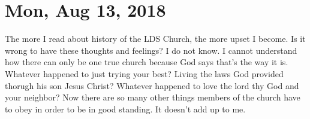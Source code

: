 \section{Mon, Aug 13, 2018}

The more I read about history of the LDS Church, the more upset I become. Is it wrong
to have these thoughts and feelings? I do not know. I cannot understand how there can
only be one true church because God says that's the way it is. Whatever happened to
just trying your best? Living the laws God provided thorugh his son Jesus Christ?
Whatever happened to love the lord thy God and your neighbor? Now there are so many
other things members of the church have to obey in order to be in good standing. It
doesn't add up to me.